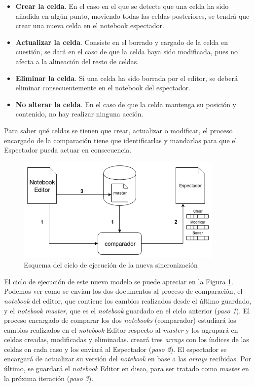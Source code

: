 \documentclass[11pt,spanish,listoffigures]{tfgetsinf}
\begin{document}
\begin{itemize}

\item \textbf{Crear la celda}. En el caso en el que se detecte que una celda ha sido añadida en algún punto, moviendo todas las celdas posteriores, se tendrá que crear una nueva celda en el notebook espectador.

\item \textbf{Actualizar la celda}. Consiste en el borrado y cargado de la celda en cuestión, se dará en el caso de que la celda haya sido modificada, pues no afecta a la alineación del resto de celdas.

\item \textbf{Eliminar la celda}. Si una celda ha sido borrada por el editor, se deberá eliminar consecuentemente en el notebook del espectador.

\item \textbf{No alterar la celda}. En el caso de que la celda mantenga su posición y contenido, no hay realizar ninguna acción.

\end{itemize}

Para saber qué celdas se tienen que crear, actualizar o modificar, el proceso encargado de la comparación tiene que identificarlas y mandarlas para que el Espectador pueda actuar en consecuencia. 

\begin{figure}[H]
	\centering
  	\includegraphics[width=0.9\textwidth]{nueva-sincro.png}
  	\caption{Esquema del ciclo de ejecución de la nueva sincronización}
  	\label{fig:new-sync}
\end{figure}

El ciclo de ejecución de este nuevo modelo se puede apreciar en la Figura \ref{fig:new-sync}. Podemos ver como se envian los dos documentos al proceso de comparación, el \textit{notebook} del editor, que contiene los cambios realizados desde el último guardado, y el \textit{notebook master}, que es el \textit{notebook} guardado en el ciclo anterior (\textit{paso 1}). El proceso encargado de comparar los dos \textit{notebooks} (comparador) estudiará los cambios realizados en el \textit{notebook} Editor respecto al \textit{master} y los agrupará en celdas creadas, modificadas y eliminadas. creará tres \textit{arrays} con los índices de las celdas en cada caso y los enviará al Espectador (\textit{paso 2}). El espectador se encargará de actualizar su versión del \textit{notebook} en base a las \textit{arrays} recibidas. Por último, se guardará el \textit{notebook} Editor en disco, para ser tratado como \textit{master} en la próxima iteración (\textit{paso 3}).
\end{document}
